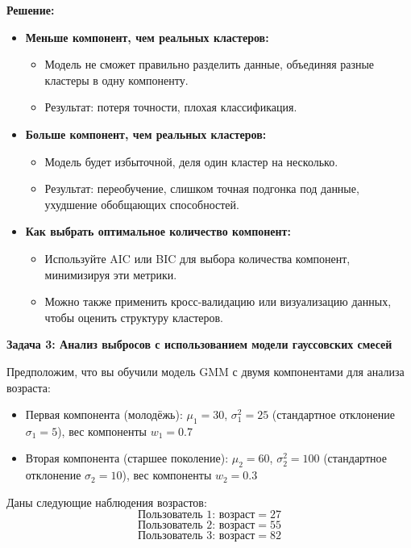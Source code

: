 \noindent\textbf{Решение:}
\begin{itemize}
    \item \textbf{Меньше компонент, чем реальных кластеров:}
          \begin{itemize}
              \item Модель не сможет правильно разделить данные, объединяя разные кластеры в одну компоненту.
              \item Результат: потеря точности, плохая классификация.
          \end{itemize}

    \item \textbf{Больше компонент, чем реальных кластеров:}
          \begin{itemize}
              \item Модель будет избыточной, деля один кластер на несколько.
              \item Результат: переобучение, слишком точная подгонка под данные, ухудшение обобщающих способностей.
          \end{itemize}

    \item \textbf{Как выбрать оптимальное количество компонент:}
          \begin{itemize}
              \item Используйте AIC или BIC для выбора количества компонент, минимизируя эти метрики.
              \item Можно также применить кросс-валидацию или визуализацию данных, чтобы оценить структуру кластеров.
          \end{itemize}
\end{itemize}

\textbf{Задача 3: Анализ выбросов с использованием модели гауссовских смесей}

Предположим, что вы обучили модель GMM с двумя компонентами для анализа возраста:

\begin{itemize}
    \item Первая компонента (молодёжь): $\mu_1 = 30$, $\sigma_1^2 = 25$ (стандартное отклонение $\sigma_1 = 5$), вес компоненты $w_1 = 0.7$
    \item Вторая компонента (старшее поколение): $\mu_2 = 60$, $\sigma_2^2 = 100$ (стандартное отклонение $\sigma_2 = 10$), вес компоненты $w_2 = 0.3$
\end{itemize}

Даны следующие наблюдения возрастов:
\[
    \text{Пользователь 1: возраст} = 27
\]
\[
    \text{Пользователь 2: возраст} = 55
\]
\[
    \text{Пользователь 3: возраст} = 82
\]

